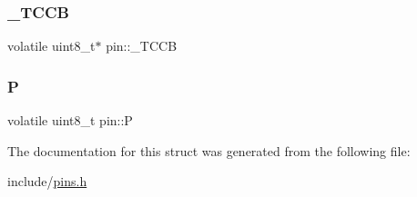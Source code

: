 \mbox{\label{structpin_a8974dff112d8e4cd0b878ff1cb5ff58a}} 
\subsubsection{\texorpdfstring{\+\_\+\+T\+C\+CB}{\_TCCB}}
{\footnotesize\ttfamily volatile uint8\+\_\+t$\ast$ pin\+::\+\_\+\+T\+C\+CB}

\mbox{\label{structpin_a367c20491645205002483e3d3c94760f}} 
\subsubsection{\texorpdfstring{P}{P}}
{\footnotesize\ttfamily volatile uint8\+\_\+t pin\+::P}



The documentation for this struct was generated from the following file\+:\begin{DoxyCompactItemize}
\item 
include/\mbox{\hyperlink{pins_8h}{pins.\+h}}\end{DoxyCompactItemize}
